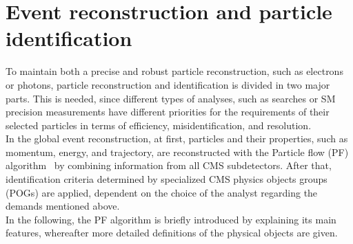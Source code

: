 \section{Event reconstruction and particle identification}\label{sec:reco}
To maintain both a precise and robust particle reconstruction, such as electrons or photons, particle reconstruction and identification is divided in two major parts. This is needed, since different types of analyses, such as searches or SM precision measurements have different priorities for the requirements of their selected particles in terms of efficiency, misidentification, and resolution.\\
In the global event reconstruction, at first, particles and their properties, such as momentum, energy, and trajectory, are reconstructed with the Particle flow (PF) algorithm~\cite{ParticleFlow} by combining information from all CMS subdetectors. After that, identification criteria determined by specialized CMS physics objects groups (POGs) are applied, dependent on the choice of the analyst regarding the demands mentioned above.\\
In the following, the PF algorithm is briefly introduced by explaining its main features, whereafter more detailed definitions of the physical objects are given.

